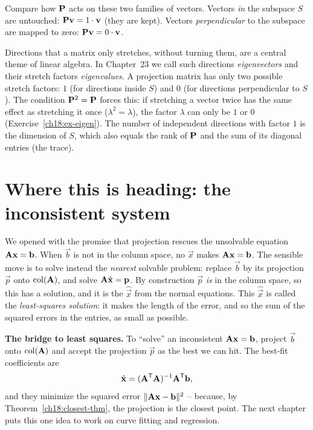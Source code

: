 \begin{aestheticbox}
Compare how $\mathbf{P}$ acts on these two families of vectors.
Vectors \emph{in} the subspace $S$ are untouched: $\mathbf{P}\mathbf{v} = 1\cdot\mathbf{v}$ (they are kept).
Vectors \emph{perpendicular} to the subspace are mapped to zero: $\mathbf{P}\mathbf{v} = 0\cdot\mathbf{v}$.

Directions that a matrix only stretches, without turning them, are a central theme of linear
algebra. In Chapter~23 we call such directions \emph{eigenvectors} and their stretch factors
\emph{eigenvalues}. A projection matrix has only two possible stretch factors: $1$ (for directions
inside $S$) and $0$ (for directions perpendicular to $S$). The condition $\mathbf{P}^2=\mathbf{P}$ forces
this: if stretching a vector twice has the same effect as stretching it once ($\lambda^2=\lambda$),
the factor $\lambda$ can only be $1$ or $0$ (Exercise~\ref{ch18:ex-eigen}). The number of
independent directions with factor $1$ is the dimension of $S$, which also equals the rank of
$\mathbf{P}$ and the sum of its diagonal entries (the trace).
\end{aestheticbox}

\section{Where this is heading: the inconsistent system}

We opened with the promise that projection rescues the unsolvable equation $\mathbf{A}\mathbf{x}=\mathbf{b}$.
When $\vec{b}$ is not in the column space, no $\vec{x}$ makes
$\mathbf{A}\mathbf{x}=\mathbf{b}$. The sensible move is to solve instead the \emph{nearest} solvable problem:
replace $\vec{b}$ by its projection $\vec{p}$ onto $\operatorname{col}(\mathbf{A})$, and solve $\mathbf{A}\hat{\mathbf{x}}
=\mathbf{p}$. By construction $\vec{p}$ \emph{is} in the column space, so this has a solution, and it
is the $\hat{\vec{x}}$ from the normal equations. This $\hat{\vec{x}}$ is called the
\emph{least-squares solution}: it makes the length of the error, and so the sum of the squared
errors in the entries, as small as possible.

\begin{focusbox}
\textbf{The bridge to least squares.} To ``solve'' an inconsistent $\mathbf{A}\mathbf{x}=\mathbf{b}$, project
$\vec{b}$ onto $\operatorname{col}(\mathbf{A})$ and accept the projection $\vec{p}$ as the best we can hit. The
best-fit coefficients are
\[
  \hat{\mathbf{x}} = (\mathbf{A}^{\mathsf{T}}\mathbf{A})^{-1}\mathbf{A}^{\mathsf{T}}\mathbf{b},
\]
and they minimize the squared error $\lVert\mathbf{A}\mathbf{x}-\mathbf{b}\rVert^2$ -- because, by
Theorem~\ref{ch18:closest-thm}, the projection is the closest point. The next chapter puts this
one idea to work on curve fitting and regression.
\end{focusbox}

